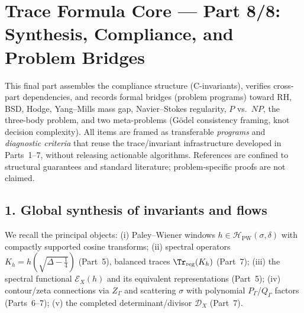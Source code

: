 
\section*{Trace Formula Core — Part 8/8: Synthesis, Compliance, and Problem Bridges}\relax\hspace{0pt}
\label{sec:tfc-part8} %

\noindent
This final part assembles the compliance structure (C-invariants), verifies cross-part dependencies, and records formal bridges (problem programs) toward RH, BSD, Hodge, Yang--Mills mass gap, Navier--Stokes regularity, $P$ vs.\ $NP$, the three-body problem, and two meta-problems (G\"odel consistency framing, knot decision complexity). All items are framed as transferable \emph{programs} and \emph{diagnostic criteria} that reuse the trace/invariant infrastructure developed in Parts~1--7, without releasing actionable algorithms. \relax\hspace{0pt}
References are confined to structural guarantees and standard literature; problem-specific proofs are not claimed. %

\subsection*{1. Global synthesis of invariants and flows}\relax\hspace{0pt}
\label{subsec:tfc8-synthesis} %

We recall the principal objects: (i) Paley–Wiener windows $h\in\mathcal{H}_{\mathrm{PW}}(\sigma,\delta)$ with compactly supported cosine transforms; (ii) spectral operators $K_h=h(\sqrt{\Delta-\tfrac14})$ (Part~5), balanced traces $\Tr_{\mathrm{reg}}(K_h)$ (Part~7); (iii) the spectral functional $\mathcal{E}_X(h)$ and its equivalent representations (Part~5); (iv) contour/zeta connections via $Z_\Gamma$ and scattering $\sigma$ with polynomial $P_\Gamma$/$Q_\Gamma$ factors (Parts~6--7); (v) the completed determinant/divisor $\mathscr{D}_X$ (Part~7). \relax\hspace{0pt}


